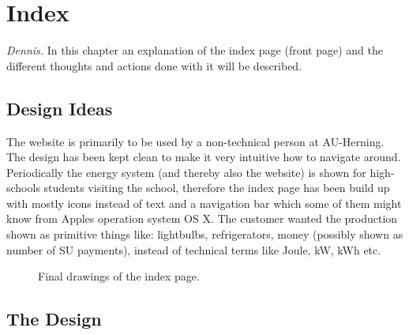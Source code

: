 \newpage
\chapter{Index}\textit{Dennis.}
In this chapter an explanation of the index page (front page)  and the different thoughts and actions done with it will be described.  
\section{Design Ideas}
The website is primarily to be used by a non-technical person at AU-Herning. The design has been kept clean to make it very intuitive how to navigate around. Periodically the energy system (and thereby also the website) is shown for high-schools students visiting the school, therefore the index page has been build up with mostly icons instead of text and a navigation bar which some of them might know from Apples operation system OS X. The customer wanted the production shown as primitive things like: lightbulbs, refrigerators, money (possibly shown as number of SU payments), instead of technical terms like Joule, kW, kWh etc.
\begin{figure}[h!]
	\center
		\setlength\fboxsep{0pt}
		\setlength\fboxrule{1pt}
   	\caption{Final drawings of the index page.}
   	\label{fig:index_page_design}
\end{figure}
\section{The Design}


